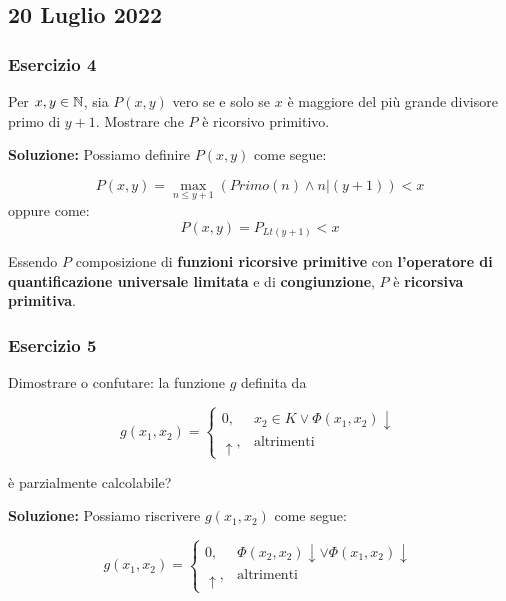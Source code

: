 \subsection{20 Luglio 2022}

\subsubsection{Esercizio 4}

Per \(x,y \in \mathbb{N}\), sia \(P(x,y)\) vero se e solo se \(x\) è maggiore del più grande divisore primo di \(y+1\). Mostrare che \(P\) è ricorsivo primitivo.

\textbf{Soluzione: } Possiamo definire \(P(x,y)\) come segue:

\begin{equation}
  P(x,y) = \max_{n \leq y+1} (Primo(n) \land n \vert (y+1)) < x
\end{equation}
oppure come:
\begin{equation}
  P(x,y) = P_{Lt(y+1)}< x
\end{equation}

Essendo \(P\) composizione di \textbf{funzioni ricorsive primitive} con \textbf{l'operatore di quantificazione universale limitata} e di \textbf{congiunzione}, \(P\) è \textbf{ricorsiva primitiva}.

\subsubsection{Esercizio 5}

Dimostrare o confutare: la funzione \(g\) definita da

\begin{equation}
  g(x_1,x_2) = \begin{cases}
    0, &x_2 \in K \lor \Phi(x_1, x_2) \downarrow\\
    \uparrow, &\text{altrimenti}
  \end{cases}
\end{equation}

è parzialmente calcolabile?

\textbf{Soluzione: } Possiamo riscrivere \(g(x_1,x_2)\) come segue:

\begin{equation}
  g(x_1,x_2) = \begin{cases}
    0, &\Phi(x_2,x_2) \downarrow \lor \Phi(x_1, x_2) \downarrow\\
    \uparrow, &\text{altrimenti}
  \end{cases}
\end{equation}

